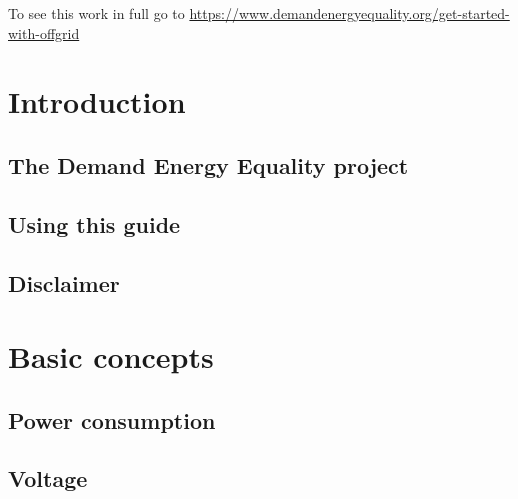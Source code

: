 \documentclass{article}
\theoremstyle{definition}
\theoremstyle{definition}
\theoremstyle{remark}
\begin{document}
    To see this work in full go to \href{https://www.demandenergyequality.org/get-started-with-offgrid}{https://www.demandenergyequality.org/get-started-with-offgrid}
  


\newpage

\section{Introduction} %
\label{sec:introduction}

  \subsection{The Demand Energy Equality project} %
  \label{sub:the_demand_energy_equality_project}

  
  \subsection{Using this guide} %
  \label{sub:using_this_guide}


  \subsection{Disclaimer} %
  \label{sub:disclaimer}


  \newpage  


\section{Basic concepts} %
\label{sec:basic_concepts}

  \subsection{Power consumption} %
  \label{sub:power_consumption}
  

  \subsection{Voltage} %
  \label{sub:voltage}
  
\end{document}

